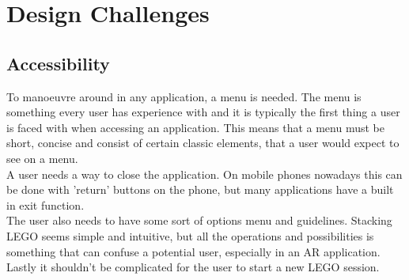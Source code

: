 
\section{Design Challenges}
\subsection{Accessibility}
To manoeuvre around in any application, a menu is needed. The menu is something every user has experience with and it is typically the first thing a user is faced with when accessing an application. This means that a menu must be short, concise and consist of certain classic elements, that a user would expect to see on a menu.\\ A user needs a way to close the application. On mobile phones nowadays this can be done with 'return' buttons on the phone, but many applications have a built in exit function.\\
The user also needs to have some sort of options menu and guidelines. Stacking LEGO seems simple and intuitive, but all the operations and possibilities is something that can confuse a potential user, especially in an AR application. \\
Lastly it shouldn't be complicated for the user to start a new LEGO session.
